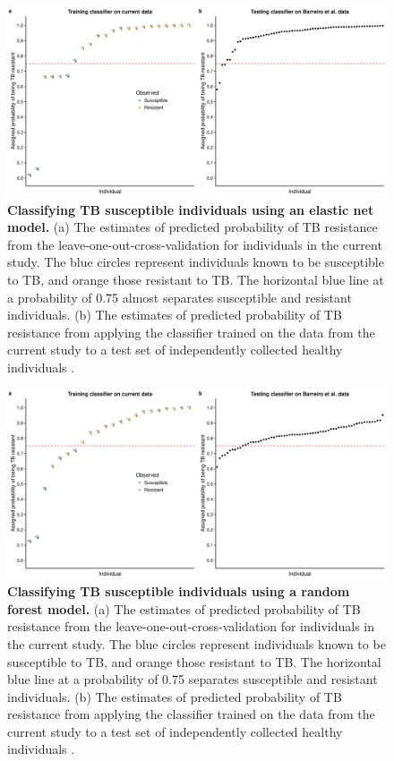 \begin{figure}[!htb]
\centering \includegraphics[width=5in]{img/ch03/classifier-en.pdf}
\caption[Classifying TB susceptible individuals using an elastic net
  model.]{ \textbf{Classifying TB susceptible individuals using an
    elastic net model.} (a) The estimates of predicted probability of
  TB resistance from the leave-one-out-cross-validation for
  individuals in the current study.  The blue circles represent
  individuals known to be susceptible to TB, and orange those
  resistant to TB. The horizontal blue line at a probability of 0.75
  almost separates susceptible and resistant individuals. (b) The
  estimates of predicted probability of TB resistance from applying
  the classifier trained on the data from the current study to a test
  set of independently collected healthy individuals
  \citep{Barreiro2012}.  }
\label{fig:class-en}
\end{figure}

\begin{figure}[!htb]
\centering \includegraphics[width=5in]{img/ch03/classifier-rf.pdf}
\caption[Classifying TB susceptible individuals using a random forest
  model.]{ \textbf{Classifying TB susceptible individuals using a
    random forest model.}  (a) The estimates of predicted probability
  of TB resistance from the leave-one-out-cross-validation for
  individuals in the current study.  The blue circles represent
  individuals known to be susceptible to TB, and orange those
  resistant to TB. The horizontal blue line at a probability of 0.75
  separates susceptible and resistant individuals.  (b) The estimates
  of predicted probability of TB resistance from applying the
  classifier trained on the data from the current study to a test set
  of independently collected healthy individuals \citep{Barreiro2012}.
}
\label{fig:class-rf}
\end{figure}

